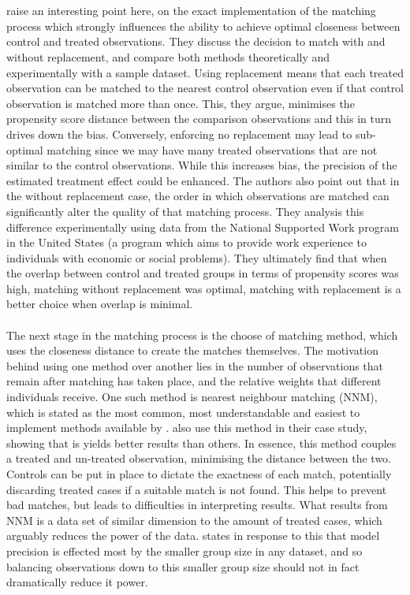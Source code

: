 {\\\\
\cite{dehejiaPSM} raise an interesting point here, on the exact implementation of the matching process which strongly influences the ability to achieve optimal closeness between control and treated observations. They discuss the decision to match with and without replacement, and compare both methods theoretically and experimentally with a sample dataset. Using replacement means that each treated observation can be matched to the nearest control observation even if that control observation is matched more than once. This, they argue, minimises the propensity score distance between the comparison observations and this in turn drives down the bias. Conversely, enforcing no replacement may lead to sub-optimal matching since we may have many treated observations that are not similar to the control observations. While this increases bias, the precision of the estimated treatment effect could be enhanced. The authors also point out that in the without replacement case, the order in which observations are matched can significantly alter the quality of that matching process. They analysis this difference experimentally using data from the National Supported Work program in the United States (a program which aims to provide work experience to individuals with economic or social problems). They ultimately find that when the overlap between control and treated groups in terms of propensity scores was high, matching without replacement was optimal, matching with replacement is a better choice when overlap is minimal. 
\\\\
The next stage in the matching process is the choose of matching method, which uses the closeness distance to create the matches themselves. The motivation behind using one method over another lies in the number of observations that remain after matching has taken place, and the relative weights that different individuals receive. One such method is nearest neighbour matching (NNM), which is stated as the most common, most understandable and easiest to implement methods available by \cite{stuart2010matching}. \cite{dehejiaPSM} also use this method in their case study, showing that is yields better results than others. In essence, this method couples a treated and un-treated observation, minimising the distance between the two. Controls can be put in place to dictate the exactness of each match, potentially discarding treated cases if a suitable match is not found. This helps to prevent bad matches, but leads to difficulties in interpreting results. What results from NNM is a data set of similar dimension to the amount of treated cases, which arguably reduces the power of the data. \cite{stuart2010matching} states in response to this that model precision is effected most by the smaller group size in any dataset, and so balancing observations down to this smaller group size should not in fact dramatically reduce it power. 
}
